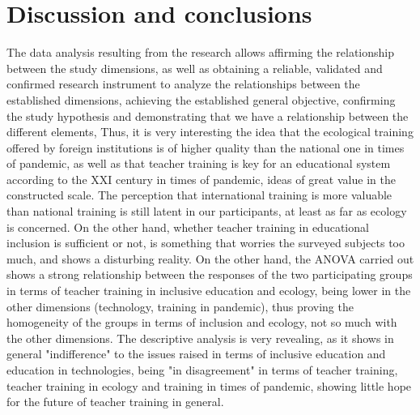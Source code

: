\documentclass[english]{textolivre}
\begin{document}
\section{Discussion and conclusions}
The data analysis resulting from the research allows affirming the relationship between the study dimensions, as well as obtaining a reliable, validated and confirmed research instrument to analyze the relationships between the established dimensions, achieving the established general objective, confirming the study hypothesis and demonstrating that we have a relationship between the different elements, Thus, it is very interesting the idea that the ecological training offered by foreign institutions is of higher quality than the national one in times of pandemic, as well as that teacher training is key for an educational system according to the XXI century in times of pandemic, ideas of great value in the constructed scale. The perception that international training is more valuable than national training is still latent in our participants, at least as far as ecology is concerned. On the other hand, whether teacher training in educational inclusion is sufficient or not, is something that worries the surveyed subjects too much, and shows a disturbing reality. On the other hand, the ANOVA carried out shows a strong relationship between the responses of the two participating groups in terms of teacher training in inclusive education and ecology, being lower in the other dimensions (technology, training in pandemic), thus proving the homogeneity of the groups in terms of inclusion and ecology, not so much with the other dimensions. The descriptive analysis is very revealing, as it shows in general "indifference" to the issues raised in terms of inclusive education and education in technologies, being "in disagreement" in terms of teacher training, teacher training in ecology and training in times of pandemic, showing little hope for the future of teacher training in general.
\end{document}
